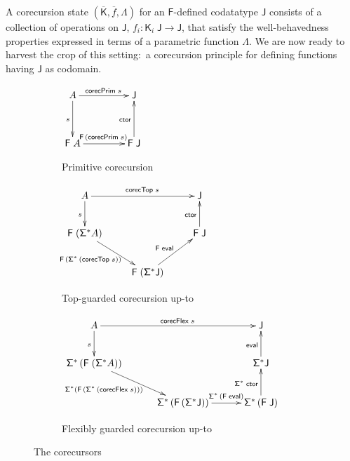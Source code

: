 \documentclass[preprint,draft]
{sigplanconf}
\newcommand\TC{\mathsf}
\newcommand{\ov}{\overline}
\newcommand{\ra}{\rightarrow}
\newcommand{\<}{\langle}
\renewcommand{\>}{\rangle}
\renewcommand{\l}{\Lambda}
\newcommand{\ctor}{{{\mathsf{ctor}}}}
\newcommand{\eval}{{{\mathsf{eval}}}}
\newcommand{\corec}{{{\mathsf{corecPrim}}}}
\newcommand\corecU{\mathsf{corecTop}}
\newcommand\corecUU{\mathsf{corecFlex}}
\newcommand{\F}{{\TC{F}}}
\newcommand{\J}{{\TC{J}}}
\renewcommand{\SS}{{\TC{\Sigma}}}
\newcommand{\K}{{\TC{K}}}
\begin{document}
A corecursion state $(\ov{\K},\ov{f},\l)$ for an $\F$-defined codatatype $\J$ consists of a collection of operations
on $\J$, $f_i : \K_i\;\J \ra \J$, that satisfy the well-behavedness properties
expressed in terms of a parametric function $\l$.
We are now ready to harvest the crop of this setting:\ a corecursion principle
for defining functions having $\J$ as codomain.

\begin{figure*}
        \centering
        \begin{subfigure}[b]{0.175\textwidth}
\centering
$\xymatrix@C=3.5pc@R=3pc{
 A
\ar^{\corec\;s}[r]
\ar_{s}[d]    &  \J
                   \\
\F\;A
\ar^{\F\,(\corec\;s)}[r]  &  \F\;\J \ar^{\ctor}[u]
}$
                \caption{Primitive corecursion}
                \label{fig-prim-corec}
        \end{subfigure}\quad
        \begin{subfigure}[b]{0.325\textwidth}
\centering
$\xymatrix@C=2pc@R=2pc{
 A
\ar^{\corecU\;s}[rr]
\ar_{s}[d]    & &  \J
                   \\
\F\;(\SS^*A)
\ar_{\!\!\!\!\F\,(\SS^*\,(\corecU\;s))\;\;}[rd]  &   & \F\;\J \ar^{\ctor}[u] \\
  & \F\;(\SS^*\J) \ar^{\F\;\eval}[ru] &
}$
                \caption{Top-guarded corecursion up-to}
                \label{fig-top-guarded-corec}
        \end{subfigure}
        \quad
        \begin{subfigure}[b]{0.425\textwidth}
\centering
$\xymatrix@C=2.5pc@R=2pc{
 A
\ar^{\corecUU\;s}[rr]
\ar_{s}[d]    & &  \J
                   \\
\SS^*\,(\F\;(\SS^*A))
\ar_{\SS^* (\F\,(\SS^*\,(\corecUU\;s)))\;\;\;\;\;\;\;\;\;\;}[dr]  &   & \SS^*\J \ar^{\eval}[u] \\
   & \SS^*\,(\F\,(\SS^*\J)) \ar^{\hspace*{2ex}\SS^*\,(\F\;\eval)}[r] & \SS^*\,(\F\;\J) \ar^{\SS^*\;\ctor}[u]
}$
                \caption{Flexibly guarded corecursion up-to}
                \label{fig-flexibly-guarded-corec}
        \end{subfigure}
        \caption{The corecursors}\label{fig-corec}
\end{figure*}
\end{document}
